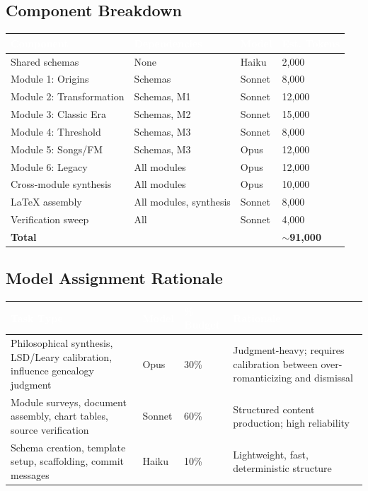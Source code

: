 \documentclass[11pt,letterpaper]{article}
\newcommand{\tableheader}[1]{\textbf{\sffamily\textcolor{white}{#1}}}
\begin{document}
\subsection{Component Breakdown}

\begin{center}
\begin{tabularx}{\textwidth}{L{3cm}L{2.5cm}C{2cm}C{1.8cm}}
\toprule
{}
\tableheader{Component} & \tableheader{Dependencies} & \tableheader{Model} & \tableheader{Est. Tokens} \\
\midrule
Shared schemas & None & Haiku & 2,000 \\
Module 1: Origins & Schemas & Sonnet & 8,000 \\
Module 2: Transformation & Schemas, M1 & Sonnet & 12,000 \\
Module 3: Classic Era & Schemas, M2 & Sonnet & 15,000 \\
Module 4: Threshold & Schemas, M3 & Sonnet & 8,000 \\
Module 5: Songs/FM & Schemas, M3 & Opus & 12,000 \\
Module 6: Legacy & All modules & Opus & 12,000 \\
Cross-module synthesis & All modules & Opus & 10,000 \\
LaTeX assembly & All modules, synthesis & Sonnet & 8,000 \\
Verification sweep & All & Sonnet & 4,000 \\
\midrule
{}
\textbf{Total} & & & \textbf{$\sim$91,000} \\
\bottomrule
\end{tabularx}
\end{center}

\subsection{Model Assignment Rationale}

\begin{center}
\begin{tabularx}{\textwidth}{L{2.5cm}C{1.5cm}C{1.5cm}X}
\toprule
{}
\tableheader{Task Type} & \tableheader{Model} & \tableheader{\% Budget} & \tableheader{Rationale} \\
\midrule
Philosophical synthesis, LSD/Leary calibration, influence genealogy judgment & Opus & 30\% & Judgment-heavy; requires calibration between over-romanticizing and dismissal \\
Module surveys, document assembly, chart tables, source verification & Sonnet & 60\% & Structured content production; high reliability \\
Schema creation, template setup, scaffolding, commit messages & Haiku & 10\% & Lightweight, fast, deterministic structure \\
\bottomrule
\end{tabularx}
\end{center}
\end{document}
